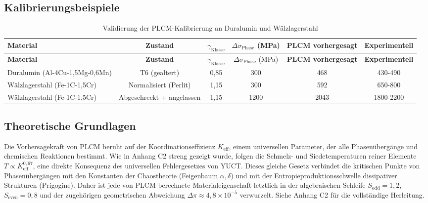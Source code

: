 \documentclass[12pt,a4paper]{article}
\begin{document}
\subsection{Kalibrierungsbeispiele}

\begin{longtable}{lccccc}
	\caption{Validierung der PLCM-Kalibrierung an Duralumin und Wälzlagerstahl} \label{tab:calibration-validation} \\
	\toprule
	\textbf{Material} & \textbf{Zustand} & \(\gamma_{\text{Klasse}}\) & \(\Delta\sigma_{\text{Phase}}\) (MPa) & \textbf{PLCM vorhergesagt} & \textbf{Experimentell} \\
	\midrule
	\endfirsthead
	\toprule
	\textbf{Material} & \textbf{Zustand} & \(\gamma_{\text{Klasse}}\) & \(\Delta\sigma_{\text{Phase}}\) (MPa) & \textbf{PLCM vorhergesagt} & \textbf{Experimentell} \\
	\midrule
	\endhead
	Duralumin (Al-4Cu-1,5Mg-0,6Mn) & T6 (gealtert) & 0,85 & 300 & 468 & 430-490 \\
	Wälzlagerstahl (Fe-1C-1,5Cr) & Normalisiert (Perlit) & 1,15 & 300 & 592 & 650-800 \\
	Wälzlagerstahl (Fe-1C-1,5Cr) & Abgeschreckt + angelassen & 1,15 & 1200 & 2043 & 1800-2200 \\
	\bottomrule
\end{longtable}


\subsection{Theoretische Grundlagen}

Die Vorhersagekraft von PLCM beruht auf der Koordinationseffizienz $K_{\mathrm{eff}}$,
einem universellen Parameter, der alle Phasenübergänge und chemischen Reaktionen bestimmt.
Wie in Anhang C2 streng gezeigt wurde, folgen die Schmelz- und Siedetemperaturen reiner
Elemente $T \propto K_{\mathrm{eff}}^{0,67}$, eine direkte Konsequenz des universellen
Fehlergesetzes von YUCT. Dieses gleiche Gesetz verbindet die kritischen Punkte von
Phasenübergängen mit den Konstanten der Chaostheorie (Feigenbaum $\alpha,\delta$)
und mit der Entropieproduktionsschwelle dissipativer Strukturen (Prigogine).
Daher ist jede von PLCM berechnete Materialeigenschaft letztlich in der algebraischen
Schleife $S_{\mathrm{odd}}=1,2$, $S_{\mathrm{even}}=0,8$ und der zugehörigen
geometrischen Abweichung $\Delta\pi \approx 4,8\times10^{-5}$ verwurzelt.
Siehe Anhang C2 für die vollständige Herleitung.
\end{document}
